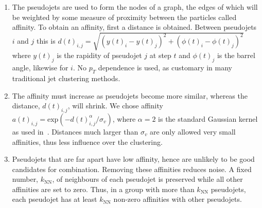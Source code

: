     \begin{enumerate}
        \item \label{step:start} The pseudojets are used to form the nodes of a graph,
        the edges of which will be weighted by some measure of proximity between the particles called affinity.
        To obtain an affinity, first a distance is obtained.
        Between pseudojets \(i\) and \(j\) this is \(d(t)_{i,j} = \sqrt{(y(t)_i - y(t)_j)^2 + (\phi(t)_i - \phi(t)_j)^2}\)
        where \(y(t)_j\) is the rapidity of pseudojet \(j\) at step \(t\) and \(\phi(t)_j\) is the barrel angle, likewise for \(i\).
        No \(p_T\) dependence is used, as customary in many traditional jet clustering methods.

    \item \label{step:affinity} The affinity must increase as pseudojets become more similar,
        whereas the distance, \(d(t)_{i,j}\), will shrink.
        We chose affinity \(a(t)_{i,j} = \text{exp}(-d(t)_{i,j}^\alpha/\sigma_v)\),
        where $\alpha=2$ is the standard Gaussian kernel as
        used in~\cite{Belkin:2003_unfound4}.
            Distances much larger than \(\sigma_v\) are only allowed very small affinities,
            thus less influence over the clustering.

    \item\label{step:KNN} Pseudojets that are far apart have low affinity,
        hence are unlikely to be good candidates for combination.
        Removing these affinities reduces noise.
    A fixed number, \(k_\text{NN}\), of neighbours of each pseudojet is 
    preserved while all other affinities are set to zero.
    Thus, in a group with more than \(k_\text{NN}\) pseudojets,
    each pseudojet has at least \(k_\text{NN}\) non-zero affinities with other pseudojets.


\end{enumerate}
